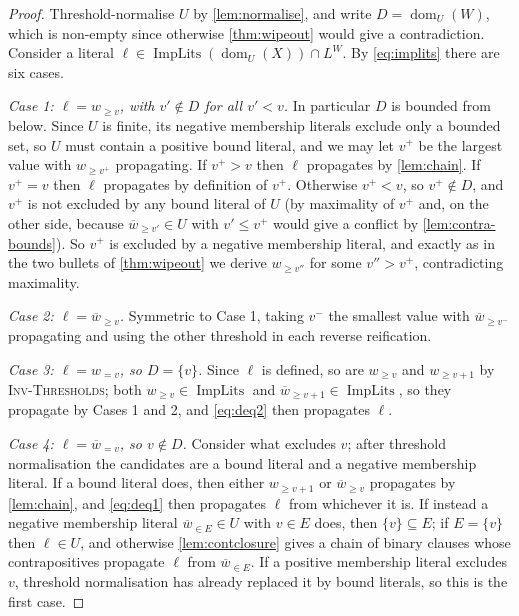 \documentclass[11pt,a4paper]{article}
\theoremstyle{plain}
\theoremstyle{definition}
\theoremstyle{remark}
\newcommand{\fname}[1]{\ensuremath{\operatorname{#1}}}
\newcommand{\dm}{\fname{dom}}
\newcommand{\ImpLits}{\fname{ImpLits}}
\newcommand{\atge}[2]{#1_{\geq #2}}
\newcommand{\ateq}[2]{#1_{= #2}}
\newcommand{\natge}[2]{\overline{#1}_{\geq #2}}
\newcommand{\nateq}[2]{\overline{#1}_{= #2}}
\newcommand{\natset}[2]{\overline{#1}_{\in #2}}
\newcommand{\inv}[1]{\textnormal{\textsc{Inv-#1}}}
\newcommand{\invThresholds}{\inv{Thresholds}}
\begin{document}
\begin{proof}
Threshold-normalise $U$ by \cref{lem:normalise}, and write $D=\dm_U(W)$, which is
non-empty since otherwise \cref{thm:wipeout} would give a contradiction.
Consider a literal $\ell\in\ImpLits(\dm_U(X))\cap L^W$.  By \cref{eq:implits}
there are six cases.

\emph{Case 1: $\ell=\atge{w}{v}$, with $v'\notin D$ for all $v'<v$.}  In
particular $D$ is bounded from below.  Since $U$ is finite, its negative membership
literals exclude only a bounded set, so $U$ must contain a positive bound
literal, and we may let $v^{+}$ be the largest value with $\atge{w}{v^{+}}$
propagating.
If $v^{+}>v$ then $\ell$ propagates by \cref{lem:chain}.  If $v^{+}=v$ then
$\ell$ propagates by definition of $v^{+}$.  Otherwise $v^{+}<v$, so
$v^{+}\notin D$, and $v^{+}$ is not excluded by any bound literal of $U$ (by
maximality of $v^{+}$ and, on the other side, because
$\natge{w}{v'}\in U$ with $v'\leq v^{+}$ would give a conflict by
\cref{lem:contra-bounds}).  So $v^{+}$ is excluded by a negative membership
literal, and exactly as in the two bullets of \cref{thm:wipeout} we derive
$\atge{w}{v''}$ for some $v''>v^{+}$, contradicting maximality.

\emph{Case 2: $\ell=\natge{w}{v}$.}  Symmetric to Case 1, taking
$v^{-}$ the smallest value with $\natge{w}{v^{-}}$ propagating and
using the other threshold in each reverse reification.

\emph{Case 3: $\ell=\ateq{w}{v}$, so $D=\{v\}$.}  Since $\ell$ is defined, so
are $\atge{w}{v}$ and $\atge{w}{v+1}$ by \invThresholds{}; both
$\atge{w}{v}\in\ImpLits$ and $\natge{w}{v+1}\in\ImpLits$, so they
propagate by Cases 1 and 2, and \cref{eq:deq2} then propagates $\ell$.

\emph{Case 4: $\ell=\nateq{w}{v}$, so $v\notin D$.}  Consider what excludes $v$;
after threshold normalisation the candidates are a bound literal and a negative
membership literal.  If a bound literal does, then either $\atge{w}{v+1}$ or
$\natge{w}{v}$ propagates by \cref{lem:chain}, and \cref{eq:deq1} then
propagates $\ell$ from whichever it is.  If instead a negative membership
literal $\natset{w}{E}\in U$ with $v\in E$ does, then $\{v\}\subseteq E$; if
$E=\{v\}$ then $\ell\in U$, and otherwise \cref{lem:contclosure} gives a chain of
binary clauses whose contrapositives propagate $\ell$ from $\natset{w}{E}$.  If a
positive membership literal excludes $v$, threshold normalisation has already replaced it
by bound literals, so this is the first case.


\end{proof}
\end{document}
